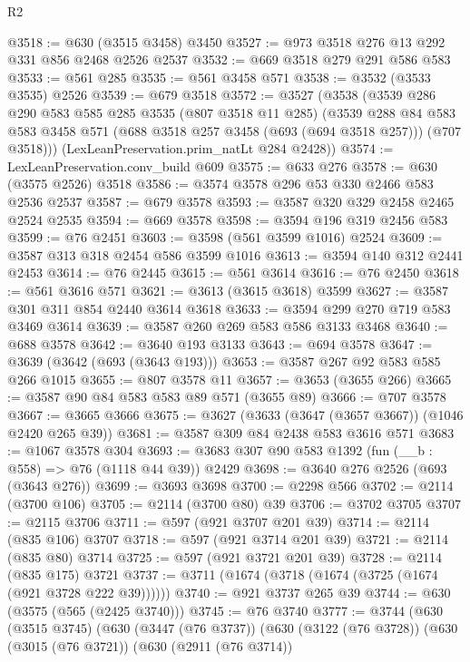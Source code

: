 \begin{lexlean}{R2}
\begin{coremodule}
@3518 := @630 (@3515 @3458) @3450
@3527 := @973 @3518 @276 @13 @292 @331 @856 @2468 @2526 @2537
@3532 := @669 @3518 @279 @291 @586 @583
@3533 := @561 @285
@3535 := @561 @3458 @571
@3538 := @3532 (@3533 @3535) @2526
@3539 := @679 @3518
@3572 := @3527
    (@3538
      (@3539
        @286
        @290
        @583
        @585
        @285
        @3535
        (@807 @3518 @11 @285)
        (@3539
          @288
          @84
          @583
          @583
          @3458
          @571
          (@688 @3518 @257 @3458 (@693 (@694 @3518 @257)))
          (@707 @3518)))
      (LexLeanPreservation.prim_natLt @284 @2428))
@3574 := LexLeanPreservation.conv_build @609
@3575 := @633 @276
@3578 := @630 (@3575 @2526) @3518
@3586 := @3574 @3578 @296 @53 @330 @2466 @583 @2536 @2537
@3587 := @679 @3578
@3593 := @3587 @320 @329 @2458 @2465 @2524 @2535
@3594 := @669 @3578
@3598 := @3594 @196 @319 @2456 @583
@3599 := @76 @2451
@3603 := @3598 (@561 @3599 @1016) @2524
@3609 := @3587 @313 @318 @2454 @586 @3599 @1016
@3613 := @3594 @140 @312 @2441 @2453
@3614 := @76 @2445
@3615 := @561 @3614
@3616 := @76 @2450
@3618 := @561 @3616 @571
@3621 := @3613 (@3615 @3618) @3599
@3627 := @3587 @301 @311 @854 @2440 @3614 @3618
@3633 := @3594 @299 @270 @719 @583 @3469 @3614
@3639 := @3587 @260 @269 @583 @586 @3133 @3468
@3640 := @688 @3578
@3642 := @3640 @193 @3133
@3643 := @694 @3578
@3647 := @3639 (@3642 (@693 (@3643 @193)))
@3653 := @3587 @267 @92 @583 @585 @266 @1015
@3655 := @807 @3578 @11
@3657 := @3653 (@3655 @266)
@3665 := @3587 @90 @84 @583 @583 @89 @571 (@3655 @89)
@3666 := @707 @3578
@3667 := @3665 @3666
@3675 := @3627 (@3633 (@3647 (@3657 @3667)) (@1046 @2420 @265 @39))
@3681 := @3587 @309 @84 @2438 @583 @3616 @571
@3683 := @1067 @3578 @304
@3693 := @3683 @307 @90 @583 @1392 (fun (__b : @558) => @76 (@1118 @44 @39)) @2429
@3698 := @3640 @276 @2526 (@693 (@3643 @276))
@3699 := @3693 @3698
@3700 := @2298 @566
@3702 := @2114 (@3700 @106)
@3705 := @2114 (@3700 @80) @39
@3706 := @3702 @3705
@3707 := @2115 @3706
@3711 := @597 (@921 @3707 @201 @39)
@3714 := @2114 (@835 @106) @3707
@3718 := @597 (@921 @3714 @201 @39)
@3721 := @2114 (@835 @80) @3714
@3725 := @597 (@921 @3721 @201 @39)
@3728 := @2114 (@835 @175) @3721
@3737 := @3711 (@1674 (@3718 (@1674 (@3725 (@1674 (@921 @3728 @222 @39))))))
@3740 := @921 @3737 @265 @39
@3744 := @630 (@3575 (@565 (@2425 @3740)))
@3745 := @76 @3740
@3777 := @3744
    (@630
      (@3515 @3745)
      (@630
        (@3447 (@76 @3737))
        (@630
          (@3122 (@76 @3728))
          (@630
            (@3015 (@76 @3721))
            (@630
              (@2911 (@76 @3714))

\end{coremodule}
\end{lexlean}
